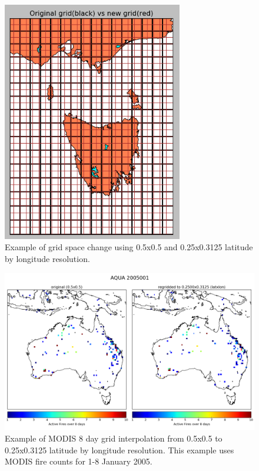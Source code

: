     \begin{figure}[!htbp]\begin{center}
      \includegraphics[width=0.7\textwidth]{Figures/MODIS_grid_space.png}
      \caption{Example of grid space change using 0.5x0.5 and 0.25x0.3125 latitude by longitude resolution.}
      \label{ch_isop:fig:modisgridspace}
    \end{center}\end{figure}
    
    \begin{figure}[!htbp]\begin{center}
      \includegraphics[width=\textwidth]{Figures/MODIS_Regrid_Comparison.png}
      \caption{Example of MODIS 8 day grid interpolation from 0.5x0.5 to 0.25x0.3125 latitude by longitude resolution.
      This example uses MODIS fire counts for 1-8 January 2005.}
      \label{ch_isop:fig:modisinterpolation}
    \end{center}\end{figure}
    
